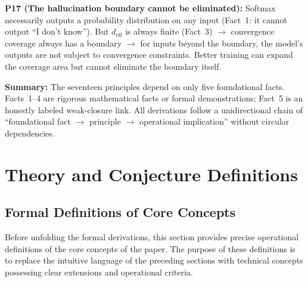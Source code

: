 \documentclass[11pt,a4paper]{article}
\theoremstyle{definition}
\begin{document}
\textbf{P17 (The hallucination boundary cannot be eliminated):} Softmax necessarily outputs a probability distribution on any input (Fact~1: it cannot output ``I don't know''). But $d_{\text{eff}}$ is always finite (Fact~3) $\to$ convergence coverage always has a boundary $\to$ for inputs beyond the boundary, the model's outputs are not subject to convergence constraints. Better training can expand the coverage area but cannot eliminate the boundary itself.

\medskip
\textbf{Summary:} The seventeen principles depend on only five foundational facts. Facts~1--4 are rigorous mathematical facts or formal demonstrations; Fact~5 is an honestly labeled weak-closure link. All derivations follow a unidirectional chain of ``foundational fact $\to$ principle $\to$ operational implication'' without circular dependencies.

\section{Theory and Conjecture Definitions}
\label{sec:definitions}

\subsection{Formal Definitions of Core Concepts}

Before unfolding the formal derivations, this section provides precise operational definitions of the core concepts of the paper. The purpose of these definitions is to replace the intuitive language of the preceding sections with technical concepts possessing clear extensions and operational criteria.
\end{document}
